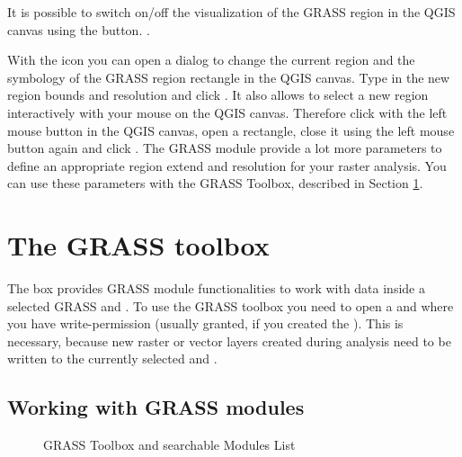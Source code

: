 It is possible to switch on/off the visualization of the GRASS region in the
QGIS canvas using the 
button. .

With the  icon you
can open a dialog to change the current region and the symbology of the GRASS
region rectangle in the QGIS canvas. Type in the new region bounds and
resolution and click . It also allows to select a new region
interactively with your mouse on the QGIS canvas. Therefore click with the
left mouse button in the QGIS canvas, open a rectangle, close it using the
left mouse button again and click .
The GRASS module  provide a lot more parameters to define
an appropriate region extend and resolution for your raster analysis. You can
use these parameters with the GRASS Toolbox, described in Section
\ref{subsec:grass_toolbox}.

\section{The GRASS toolbox}\label{subsec:grass_toolbox}

The  box provides GRASS module
functionalities to work with data inside a selected GRASS 
and . To use the GRASS toolbox you need to open a
 and  where you have write-permission
(usually granted, if you created the ). This is necessary,
because new raster or vector layers created during analysis need to be written
to the currently selected  and .

\subsection{Working with GRASS modules}\label{grass_modules}

\begin{figure}[ht]
\centering
   \hspace{0.5cm}
\caption{GRASS Toolbox and searchable Modules List \nixcaption}\label{fig:grass_modules}
\end{figure}

